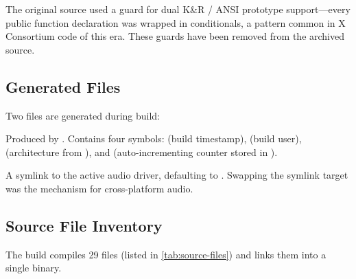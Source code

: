 \documentclass[11pt,a4paper]{article}
\begin{document}
The original source used a  guard for dual K\&R / ANSI prototype support---every public function declaration was wrapped in  conditionals, a pattern common in X Consortium code of this era. These guards have been removed from the archived source.

\subsection{Generated Files}
\label{sec:generated-files}

Two files are generated during build:

\begin{description}[style=nextline]
  \item[\file{version.c}] Produced by . Contains four symbols:  (build timestamp),  (build user),  (architecture from ), and  (auto-incrementing counter stored in ).
  \item[\file{audio.c}] A symlink to the active audio driver, defaulting to . Swapping the symlink target was the mechanism for cross-platform audio.
\end{description}

\subsection{Source File Inventory}
\label{sec:source-inventory}

The build compiles 29  files (listed in \cref{tab:source-files}) and links them into a single  binary.
\end{document}
